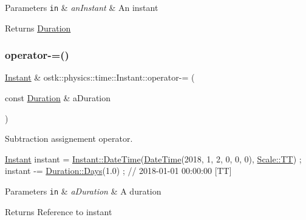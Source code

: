 \begin{DoxyParams}[1]{Parameters}
\mbox{\tt in}  & {\em an\+Instant} & An instant \\
\hline
\end{DoxyParams}
\begin{DoxyReturn}{Returns}
\hyperlink{classostk_1_1physics_1_1time_1_1_duration}{Duration} 
\end{DoxyReturn}
\mbox{\label{classostk_1_1physics_1_1time_1_1_instant_abac01f937383ef281b4047ad692453ba}} 
\subsubsection{\texorpdfstring{operator-\/=()}{operator-=()}}
{\footnotesize\ttfamily \hyperlink{classostk_1_1physics_1_1time_1_1_instant}{Instant} \& ostk\+::physics\+::time\+::\+Instant\+::operator-\/= (\begin{DoxyParamCaption}\item[{const \hyperlink{classostk_1_1physics_1_1time_1_1_duration}{Duration} \&}]{a\+Duration }\end{DoxyParamCaption})}



Subtraction assignement operator. 


\begin{DoxyCode}
\hyperlink{classostk_1_1physics_1_1time_1_1_instant_a132c1e4b2fe9a9a671109206e297bd5d}{Instant} instant = \hyperlink{classostk_1_1physics_1_1time_1_1_instant_afd5725574a02389b80fad4baff313c8a}{Instant::DateTime}(\hyperlink{classostk_1_1physics_1_1time_1_1_instant_afd5725574a02389b80fad4baff313c8a}{DateTime}(2018, 1, 2, 0, 0, 0), 
      \hyperlink{namespaceostk_1_1physics_1_1time_adf23d37bd8641fb76a0e98ab46a70df7adf1f3edb9115acb0a1e04209b7a9937b}{Scale::TT}) ;
instant -= \hyperlink{classostk_1_1physics_1_1time_1_1_duration_aefb4abc87c6957d00650228d069fa1e1}{Duration::Days}(1.0) ; \textcolor{comment}{// 2018-01-01 00:00:00 [TT]}
\end{DoxyCode}



\begin{DoxyParams}[1]{Parameters}
\mbox{\tt in}  & {\em a\+Duration} & A duration \\
\hline
\end{DoxyParams}
\begin{DoxyReturn}{Returns}
Reference to instant 
\end{DoxyReturn}
\mbox{\label{classostk_1_1physics_1_1time_1_1_instant_a17692f0ecb5ab2feecf153c0e1d9d2a4}} 
